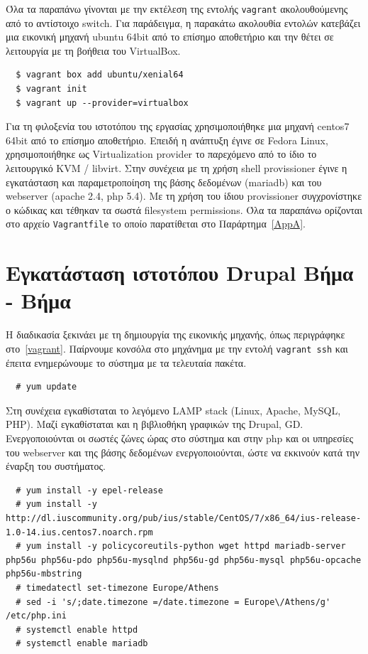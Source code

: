 \documentclass[12pt]{report}
\begin{document}
Όλα τα παραπάνω γίνονται με την εκτέλεση της εντολής \textlatin{\texttt{vagrant}} ακολουθούμενης από το αντίστοιχο \textlatin{switch}. Για παράδειγμα, η παρακάτω ακολουθία εντολών κατεβάζει μια εικονική μηχανή \textlatin{ubuntu 64bit} από το επίσημο αποθετήριο και την θέτει σε λειτουργία με τη βοήθεια του \textlatin{VirtualBox}.
\scriptsize
\begin{verbatim}
  $ vagrant box add ubuntu/xenial64
  $ vagrant init
  $ vagrant up --provider=virtualbox
\end{verbatim}
\normalsize
{}

Για τη φιλοξενία του ιστοτόπου της εργασίας χρησιμοποιήθηκε μια μηχανή \textlatin{centos7 64bit} από το επίσημο αποθετήριο. Επειδή η ανάπτυξη έγινε σε \textlatin{Fedora Linux}, χρησιμοποιήθηκε ως \textlatin{Virtualization provider} το παρεχόμενο από το ίδιο το λειτουργικό \textlatin{KVM / libvirt}. Στην συνέχεια με τη χρήση \textlatin{shell provissioner} έγινε η εγκατάσταση και παραμετροποίηση της βάσης δεδομένων (\textlatin{mariadb}) και του \textlatin{webserver (apache 2.4, php 5.4)}. Με τη χρήση του ίδιου \textlatin{provissioner} συγχρονίστηκε ο κώδικας και τέθηκαν τα σωστά \textlatin{filesystem permissions}.
Όλα τα παραπάνω ορίζονται στο αρχείο \textlatin{\texttt{Vagrantfile}} το οποίο παρατίθεται στο Παράρτημα~\ref{AppA}.

\section{Εγκατάσταση ιστοτόπου \textlatin{Drupal} Βήμα - Βήμα}\label{manual_setup}
Η διαδικασία ξεκινάει με τη δημιουργία της εικονικής μηχανής, όπως περιγράφηκε στο~\ref{vagrant}. Παίρνουμε κονσόλα στο μηχάνημα με την εντολή \textlatin{\texttt{vagrant ssh}} και έπειτα ενημερώνουμε το σύστημα με τα τελευταία πακέτα.
\scriptsize
\begin{verbatim}
  # yum update
\end{verbatim}
\normalsize
{}

Στη συνέχεια εγκαθίσταται το λεγόμενο \textlatin{LAMP stack (Linux, Apache, MySQL, PHP)}. Μαζί εγκαθίσταται και η βιβλιοθήκη γραφικών της \textlatin{Drupal, GD}. Ενεργοποιούνται οι σωστές ζώνες ώρας στο σύστημα και στην \textlatin{php} και οι υπηρεσίες του \textlatin{webserver} και της βάσης δεδομένων ενεργοποιούνται, ώστε να εκκινούν κατά την έναρξη του συστήματος.
\scriptsize
\begin{verbatim}
  # yum install -y epel-release
  # yum install -y http://dl.iuscommunity.org/pub/ius/stable/CentOS/7/x86_64/ius-release-1.0-14.ius.centos7.noarch.rpm
  # yum install -y policycoreutils-python wget httpd mariadb-server php56u php56u-pdo php56u-mysqlnd php56u-gd php56u-mysql php56u-opcache php56u-mbstring
  # timedatectl set-timezone Europe/Athens
  # sed -i 's/;date.timezone =/date.timezone = Europe\/Athens/g' /etc/php.ini
  # systemctl enable httpd
  # systemctl enable mariadb
\end{verbatim}
\normalsize
{}
\end{document}
